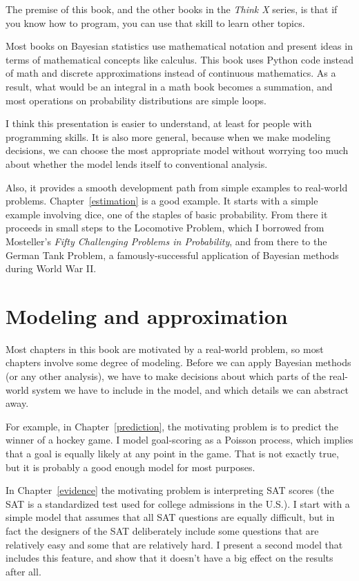 \documentclass[12pt]{book}
\begin{document}
The premise of this book, and the other books in the {\it Think X}
series, is that if you know how to program, you
can use that skill to learn other topics.

Most books on Bayesian statistics use mathematical notation and
present ideas in terms of mathematical concepts like calculus.
This book uses Python code instead of math and discrete approximations
instead of continuous mathematics.  As a result, what would
be an integral in a math book becomes a summation, and
most operations on probability distributions are simple loops.

I think this presentation is easier to understand, at least for people with
programming skills.  It is also more general, because when we make
modeling decisions, we can choose the most appropriate model without
worrying too much about whether the model lends itself to conventional
analysis.

Also, it provides a smooth development path from
simple examples to real-world problems.  Chapter~\ref{estimation} is a
good example.  It starts with a simple example involving dice, one of
the staples of basic probability.  From there it proceeds in small
steps to the Locomotive Problem, which I borrowed from Mosteller's
{\it Fifty Challenging Problems in Probability}, and from there to the
German Tank Problem, a famously-successful application of Bayesian
methods during World War II.


\section{Modeling and approximation}

Most chapters in this book are motivated by a real-world problem,
so most chapters involve some degree of modeling.   Before we
can apply Bayesian methods (or any other analysis), we have to
make decisions about which parts of the real-world system we
have to include in the model, and which details we can abstract
away.

For example, in Chapter~\ref{prediction}, the motivating problem is to
predict the winner of a hockey game.  I model goal-scoring as a
Poisson process, which implies that a goal is equally likely at any
point in the game.  That is not exactly true, but it is probably a
good enough model for most purposes.

In Chapter~\ref{evidence} the motivating problem is interpreting SAT
scores (the SAT is a standardized test used for college admissions in
the U.S.).  I start with a simple model that assumes that all SAT
questions are equally difficult, but in fact the designers of the SAT
deliberately include some questions that are relatively easy and some
that are relatively hard.  I present a second model that includes this
feature, and show that it doesn't have a big effect on the results
after all.
\end{document}
